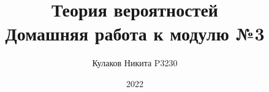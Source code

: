 
\title{Теория вероятностей\\ Домашняя работа к модулю №3}
\date{2022}
\author{Кулаков Никита P3230}



\maketitle

\begin{sloppypar}
\tableofcontents
\newpage


\end{sloppypar}


